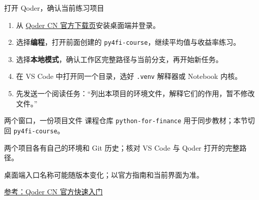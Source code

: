 \documentclass[9pt]{ctexbeamer}
\begin{document}
\begin{frame}{打开 Qoder，确认当前练习项目}
  \begin{enumerate}
    \item 从 \href{https://qoder.cn/download}{Qoder CN 官方下载页}安装桌面端并登录。
    \item 选择\textbf{编程}，打开前面创建的 \texttt{py4fi-course}，继续平均值与收益率练习。
    \item 选择\textbf{本地模式}，确认工作区完整路径与当前分支，再开始新任务。
    \item 在 VS Code 中打开同一个目录，选好 \texttt{.venv} 解释器或 Notebook 内核。
    \item 先发送一个阅读任务：“列出本项目的环境文件，解释它们的作用，暂不修改文件。”
  \end{enumerate}
  \begin{block}{两个窗口，一份项目文件}
    课程仓库 \texttt{python-for-finance} 用于同步教材；本节切回 \texttt{py4fi-course}。\par
    两个项目各有自己的环境和 Git 历史；核对 VS Code 与 Qoder 打开的完整路径。
  \end{block}
  {\small 桌面端入口名称可能随版本变化；以官方指南和当前界面为准。}
  \par{\tiny\href{https://docs.qoder.cn/qoder/quickstart}{参考：Qoder CN 官方快速入门}}
\end{frame}
\end{document}
